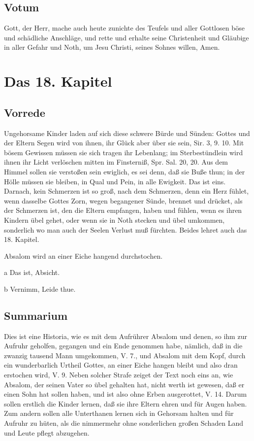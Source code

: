 \section{Votum}

Gott, der Herr, mache auch heute zunichte des Teufels und aller Gottlosen böse und schädliche Anschläge, und rette und erhalte seine Christenheit und Gläubige in aller Gefahr und Noth, um Jesu Christi, seines Sohnes willen, Amen.

\chapter{Das 18. Kapitel}

\section{Vorrede}

Ungehorsame Kinder laden auf sich diese schwere Bürde und Sünden: Gottes und der Eltern Segen wird von ihnen, ihr Glück aber über sie sein, Sir. 3, 9. 10. Mit bösem Gewissen müssen sie sich tragen ihr Lebenlang; im Sterbestündlein wird ihnen ihr Licht verlöschen mitten im Finsterniß, Spr. Sal. 20, 20. Aus dem Himmel sollen sie verstoßen sein ewiglich, es sei denn, daß sie Buße thun; in der Hölle müssen sie bleiben, in Qual und Pein, in alle Ewigkeit. Das ist eins. Darnach, kein Schmerzen ist so groß, nach dem Schmerzen, denn ein Herz fühlet, wenn dasselbe Gottes Zorn, wegen begangener Sünde, brennet und drücket, als der Schmerzen ist, den die Eltern empfangen, haben und fühlen, wenn es ihren Kindern übel gehet, oder wenn sie in Noth stecken und übel umkommen, sonderlich wo man auch der Seelen Verlust muß fürchten. Beides lehret auch das 18. Kapitel.

Absalom wird an einer Eiche hangend durchstochen.

a Das ist, Absicht.

b Vernimm, Leide thue.

\section{Summarium}

Dies ist eine Historia, wie es mit dem Aufrührer Absalom und denen, so ihm zur Aufruhr geholfen, gegangen und ein Ende genommen habe, nämlich, daß in die zwanzig tausend Mann umgekommen, V. 7., und Absalom mit dem Kopf, durch ein wunderbarlich Urtheil Gottes, an einer Eiche hangen bleibt und also dran erstochen wird, V. 9. Neben solcher Strafe zeiget der Text noch eins an, wie Absalom, der seinen Vater so übel gehalten hat, nicht werth ist gewesen, daß er einen Sohn hat sollen haben, und ist also ohne Erben ausgerottet, V. 14. Darum sollen erstlich die Kinder lernen, daß sie ihre Eltern ehren und für Augen haben. Zum andern sollen alle Unterthanen lernen sich in Gehorsam halten und für Aufruhr zu hüten, als die nimmermehr ohne sonderlichen großen Schaden Land und Leute pflegt abzugehen.


